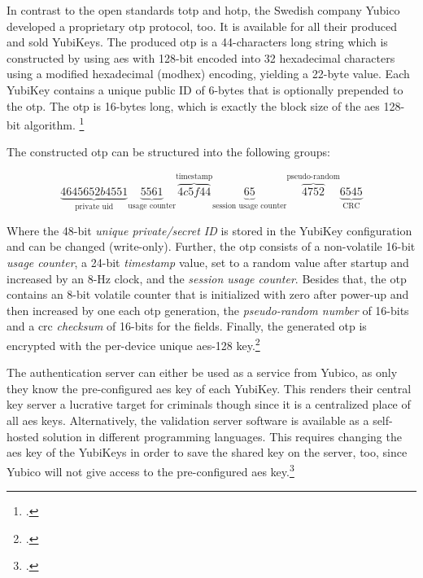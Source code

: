 In contrast to the open standards \gls{totp} and \gls{hotp}, the Swedish company Yubico developed a proprietary \gls{otp} protocol, too. It is available for all their produced and sold YubiKeys. The produced \gls{otp} is a 44-characters long string which is constructed by using \gls{aes} with 128-bit encoded into 32 hexadecimal characters using a modified hexadecimal (\frqq modhex\flqq) encoding, yielding a 22-byte value. Each YubiKey contains a unique public ID of 6-bytes that is optionally prepended to the \gls{otp}. The \gls{otp} is 16-bytes long, which is exactly the block size of the \gls{aes} 128-bit algorithm. \footcites[][]{10.1007/978-3-642-38004-4_17}[See][84--86]{Jacobs:2016:STA:2953926.2953927}

The constructed \gls{otp} can be structured into the following groups:

\begin{equation*}
	\underbrace{4645652b4551}_\text{private uid}\underbrace{5561}_\text{usage counter}\overbrace{4c5f44}^\text{timestamp}\underbrace{65}_\text{session usage counter}\overbrace{4752}^\text{pseudo-random}\underbrace{6545}_\text{CRC}
\end{equation*}

Where the 48-bit \textit{unique private/secret ID} is stored in the YubiKey configuration and can be changed (write-only). Further, the \gls{otp} consists of a non-volatile 16-bit \textit{usage counter}, a 24-bit \textit{timestamp} value, set to a random value after startup and increased by an 8-Hz clock, and the \textit{session usage counter}. Besides that, the \gls{otp} contains an 8-bit volatile counter that is initialized with zero after power-up and then increased by one each \gls{otp} generation, the \textit{pseudo-random number} of 16-bits and a \gls{crc} \textit{checksum} of 16-bits for the fields. Finally, the generated \gls{otp} is encrypted with the per-device unique \gls{aes}-128 key.\footcites[See][8--9, 33--34]{yubico-otp}[See][209--210]{10.1007/978-3-642-41284-4_11}

The authentication server can either be used as a service from Yubico, as only they know the pre-configured \gls{aes} key of each YubiKey. This renders their central key server a lucrative target for criminals though since it is a centralized place of all \gls{aes} keys. Alternatively, the validation server software is available as a self-hosted solution in different programming languages. This requires changing the \gls{aes} key of the YubiKeys in order to save the shared key on the server, too, since Yubico will not give access to the pre-configured \gls{aes} key.\footcites[See][8--9]{yubico-cloud}